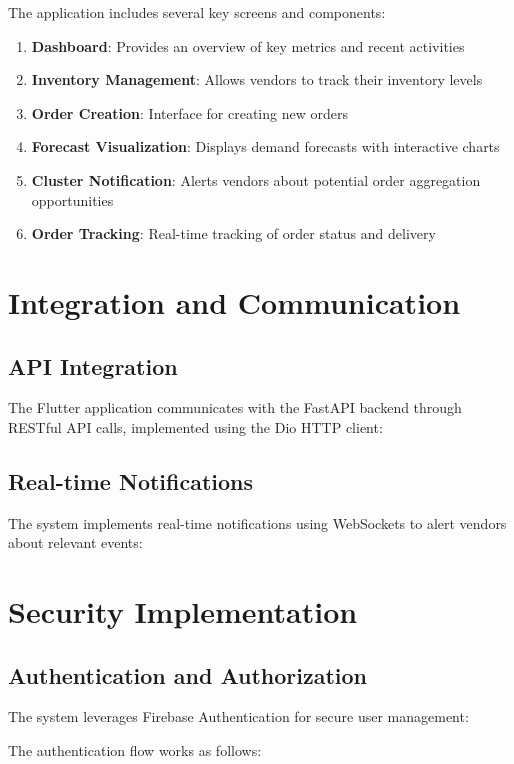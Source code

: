 The application includes several key screens and components:

\begin{enumerate}
    \item \textbf{Dashboard}: Provides an overview of key metrics and recent activities
    \item \textbf{Inventory Management}: Allows vendors to track their inventory levels
    \item \textbf{Order Creation}: Interface for creating new orders
    \item \textbf{Forecast Visualization}: Displays demand forecasts with interactive charts
    \item \textbf{Cluster Notification}: Alerts vendors about potential order aggregation opportunities
    \item \textbf{Order Tracking}: Real-time tracking of order status and delivery
\end{enumerate}

\section{Integration and Communication}

\subsection{API Integration}

The Flutter application communicates with the FastAPI backend through RESTful API calls, implemented using the Dio HTTP client:

\subsection{Real-time Notifications}

The system implements real-time notifications using WebSockets to alert vendors about relevant events:

\section{Security Implementation}
\subsection{Authentication and Authorization}

The system leverages Firebase Authentication for secure user management:

The authentication flow works as follows:

